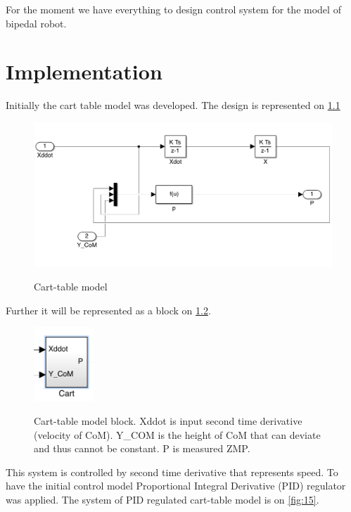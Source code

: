 \documentclass[12pt,a4paper]{report}
\begin{document}
			For the moment we have everything to design control system for the model of bipedal robot.
	\chapter{Implementation}
		Initially the cart table model was developed. The design is represented on \cref{fig:13}
		\begin{figure}[h!]
			\vspace{-0.2cm}
			\centering
			{\includegraphics[width=1\textwidth]{13}}
			\caption{Cart-table model}
			\label{fig:13}
			\vspace{-0.1cm}
		\end{figure}
		
		Further it will be represented as a block on \cref{fig:14}.
		
		\begin{figure}[h!]
			\vspace{-0.2cm}
			\centering
			{\includegraphics[width=0.2\textwidth]{14}}
			\caption{Cart-table model block. Xddot is input second time derivative (velocity of CoM). Y\_COM is the height of CoM that can deviate and thus cannot be constant. P is measured ZMP.}
			\label{fig:14}
			\vspace{-0.1cm}
		\end{figure}
		
		This system is controlled by second time derivative that represents speed. To have the initial control model Proportional Integral Derivative (PID) regulator was applied. The system of PID regulated cart-table model is on \cref{fig:15}.
		
\end{document}
